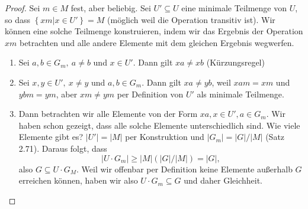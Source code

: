 \begin{proof}
	Sei $m\in M$ fest, aber beliebig. Sei $U'\subseteq U$ eine minimale Teilmenge von $U$, so dass $\left\{ xm|x\in U' \right\} =M$ (möglich weil die Operation transitiv ist). Wir können eine solche Teilmenge konstruieren, indem wir das Ergebnis der Operation $xm$ betrachten und alle andere Elemente mit dem gleichen Ergebnis wegwerfen.  
	\begin{enumerate}[label=(\roman*)]
		\item Sei $a,b\in G_m,~a\neq b$ und $x\in U'$. Dann gilt $xa\neq xb$ (Kürzungsregel)
		\item Sei $x,y\in U',~x\neq y$ und $a,b\in G_m$. Dann gilt $xa\neq yb$, weil $xam=xm$ und $ybm=ym$, aber $xm\neq ym$ per Definition von $U'$ als minimale Teilmenge.
		\item Dann betrachten wir alle Elemente von der Form $xa,x\in U', a\in G_m$. Wir haben schon gezeigt, dass alle solche Elemente unterschiedlich sind. Wie viele Elemente gibt es? $|U'|=|M|$ per Konstruktion und $|G_m|=|G| / |M|$ (Satz 2.71). Daraus folgt, dass
			\[
			|U\cdot G_m|\ge |M|(|G| / |M|)=|G|
			,\]
			also $G\subseteq U\cdot G_M$. Weil wir offenbar per Definition keine Elemente außerhalb $G$ erreichen können, haben wir also $U\cdot G_m\subseteq G$ und daher Gleichheit.
	\end{enumerate}
\end{proof}

